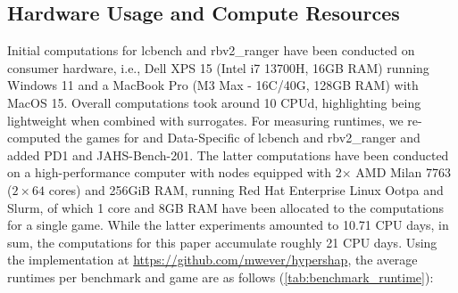 \documentclass[letterpaper]{article} %
\begin{document}
\subsection{Hardware Usage and Compute Resources}
Initial computations for lcbench and rbv2\_ranger have been conducted on consumer hardware, i.e., Dell XPS 15 (Intel i7 13700H, 16GB RAM) running Windows 11 and a MacBook Pro (M3 Max - 16C/40G, 128GB RAM) with MacOS 15. Overall computations took around 10 CPUd, highlighting \tool being lightweight when combined with surrogates. For measuring runtimes, we re-computed the games for \ablation and Data-Specific \tunability of lcbench and rbv2\_ranger and added PD1 and JAHS-Bench-201. The latter computations have been conducted on a high-performance computer with nodes equipped with 2$\times$ AMD Milan 7763 ($2\times 64$ cores)  and 256GiB RAM, running Red Hat Enterprise Linux Ootpa and Slurm, of which 1 core and 8GB RAM have been allocated to the computations for a single game. While the latter experiments amounted to 10.71 CPU days, in sum, the computations for this paper accumulate roughly 21 CPU days. Using the implementation at \url{https://github.com/mwever/hypershap}, the average runtimes per benchmark and game are as follows (\cref{tab:benchmark_runtime}):
\begin{table}[h!]
\centering
\caption{}
\label{tab:benchmark_runtime}
\end{table}
\end{document}

